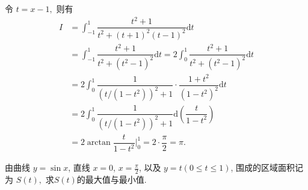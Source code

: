 \begin{solution}
令 $t = x - 1,$ 则有
\begin{equation*}
\begin{aligned}
I & = \int_{-1}^1 \dfrac{t^2 + 1}{t^2 + (t+1)^2(t-1)^2} \mathrm{d} t \\
& = \int_{-1}^1 \dfrac{t^2 + 1}{t^2 + (t^2 - 1)^2} \mathrm{d} t = 2 \int_0^1 \dfrac{t^2 + 1}{t^2 + (t^2 - 1)^2} \mathrm{d} t \\
& = 2 \int_0^1 \dfrac{1}{(t / (1 - t^2))^2 + 1} \cdot \dfrac{1 + t^2}{(1 - t^2)^2} \mathrm{d} t \\
& = 2 \int_0^1 \dfrac{1}{(t / (1 - t^2))^2 + 1} \mathrm{d} \left( \dfrac{t}{1 - t^2} \right) \\
& = 2 \arctan \dfrac{t}{1 - t^2} \Big|_0^1 = 2 \cdot \dfrac{\pi}{2} = \pi.
\end{aligned}
\end{equation*}
\end{solution}


\begin{question}[points = 10]
由曲线 $y=\sin x$, 直线 $x=0$, $x=\frac{\pi}{2}$, 以及 $y=t (0\leqslant t \leqslant 1)$, 围成的区域面积记为 $S(t),$ 求$S(t)$的最大值与最小值.

\end{question}

